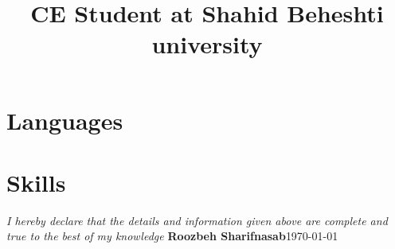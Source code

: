 \documentclass[11pt, a4paper, color, final]{moderncv}
\title{CE Student at Shahid Beheshti university}
\begin{document}
\maketitle





\section{Languages}

\section{Skills}












\iffalse
\section{References}
\begin{cvcolumns}
  \begin{itemize}\item Prof.\ Sadegh Aliakbari\item Mr.\ Parham Alvani\item Prof.\ Mojtaba Vahidi\end{itemize}
\end{cvcolumns}
\fi

\emptysection{}\closesection{}
\vfill
\textit{I hereby declare that the details and information given above are complete and true to the best of my knowledge}
\linebreak
\textbf{Roozbeh Sharifnasab}\hfil\today
\end{document}
